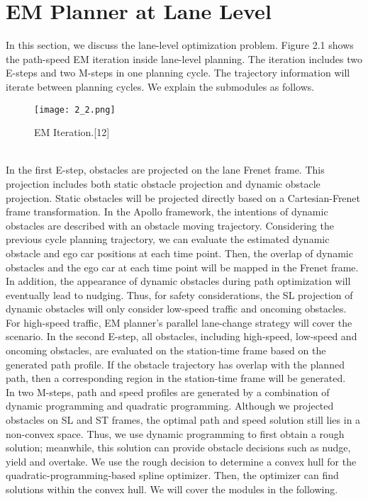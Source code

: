 \documentclass{thesisreport}
\begin{document}
\section{EM Planner at Lane Level}
In this section, we discuss the lane-level optimization problem. Figure 2.1 shows the path-speed EM iteration inside lane-level planning. The iteration includes two E-steps and two M-steps in one planning cycle. The trajectory information will iterate between planning cycles. We explain the submodules as follows.
    \begin{figure}[ht]
	\centering
	\texttt{[image: 2\_2.png]}
	\caption{EM Iteration.[12]}
	\label{fig:2.2} 
\end{figure}\\
\indent
In the first E-step, obstacles are projected on the lane Frenet frame. This projection includes both static obstacle projection and dynamic obstacle projection. Static obstacles will be projected directly based on a Cartesian-Frenet frame transformation. In the Apollo framework, the intentions of dynamic obstacles are described with an obstacle moving trajectory. Considering the previous cycle planning trajectory, we can evaluate the estimated dynamic obstacle and ego car positions at each time point. Then, the overlap of dynamic obstacles and the ego car at each time point will be mapped in the Frenet frame. In addition, the appearance of dynamic obstacles during path optimization will eventually lead to nudging. Thus, for safety considerations, the SL projection of dynamic obstacles will only consider low-speed traffic and oncoming obstacles. For high-speed traffic, EM planner’s parallel lane-change strategy will cover the scenario. In the second E-step, all obstacles, including high-speed, low-speed and oncoming obstacles, are evaluated on the station-time frame based on the generated path profile. If the obstacle trajectory has overlap with the planned path, then a corresponding region in the station-time frame will be generated.\\
\indent
In two M-steps, path and speed profiles are generated by a combination of dynamic programming and quadratic programming. Although we projected obstacles on SL and ST frames, the optimal path and speed solution still lies in a non-convex space. Thus, we use dynamic programming to first obtain a rough solution; meanwhile, this solution can provide obstacle decisions such as nudge, yield and overtake. We use the rough decision to determine a convex hull for the quadratic-programming-based spline optimizer. Then, the optimizer can find solutions within the convex hull. We will cover the modules in the following.
\end{document}
